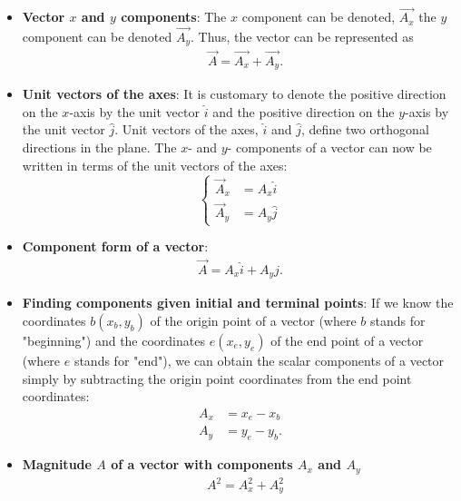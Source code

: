 \documentclass{report}
\begin{document}
\begin{itemize}
        \item \textbf{Vector $x$ and $y$ components}: The $x$ component can be denoted, $\vec{A_{x}}$ the $y$ component can be denoted $\vec{A_{y}}$. Thus, the vector can be represented as
            \begin{align*}
                &\vec{A} = \vec{A_{x}} + \vec{A_{y}}
            .\end{align*}
        \item \textbf{Unit vectors of the axes}:     It is customary to denote the positive direction on the $x$-axis by the unit vector $\hat{i}$ and the positive direction on the $y$-axis by the unit vector $\hat{j}$. Unit vectors of the axes, $\hat{i}$ and $\hat{j}$, define two orthogonal directions in the plane. The $x$- and $y$- components of a vector can now be written in terms of the unit vectors of the axes:
            \bigbreak \noindent 
               \begin{equation}
                    \begin{cases}
                        \vec{A}_{x} &= A_{x}\hat{i}  \\
                         \vec{A}_{y} &= A_{y}\hat{j}  
                    \end{cases}
                \end{equation}
        \item \textbf{Component form of a vector}:
            \begin{align*}
                \vec{A} = A_{x}\hat{i} + A_{y}\hat{j}
            .\end{align*}
        \item \textbf{Finding components given initial and terminal points}: If we know the coordinates $b(x_b, y_b)$ of the origin point of a vector (where $b$ stands for "beginning") and the coordinates $e(x_e, y_e)$ of the end point of a vector (where $e$ stands for "end"), we can obtain the scalar components of a vector simply by subtracting the origin point coordinates from the end point coordinates:
            \begin{align*}
                A_x &= x_e - x_b  \\
                A_y &= y_e - y_b
            .\end{align*}
        \item \textbf{Magnitude $A$ of a vector with components $A_{x}$ and $A_{y}$}
            \begin{align*}
               &A^{2}  = A_{x}^{2} + A_{y}^{2} \\

\end{align*}
\end{itemize}
\end{document}
